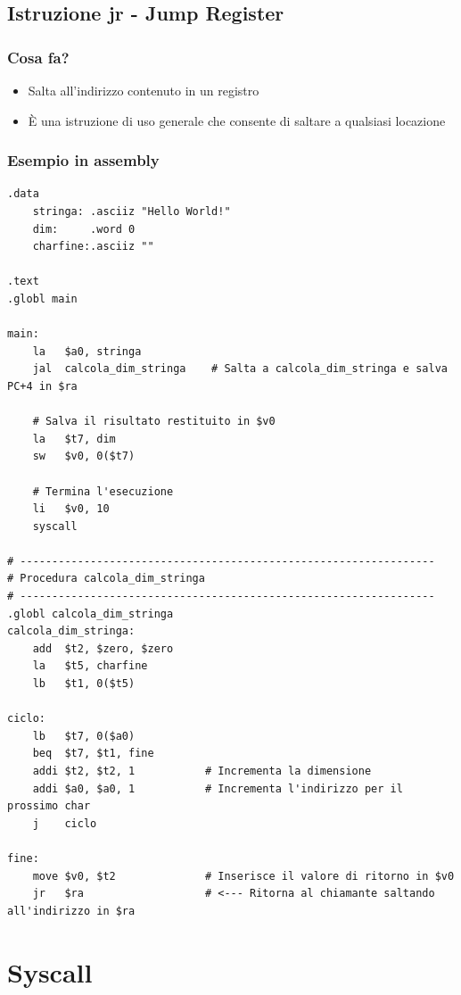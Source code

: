 \newpage
\subsection{Istruzione jr - Jump Register}
\subsubsection{Cosa fa?}
\begin{itemize}
    \item Salta all'indirizzo contenuto in un registro
    \item È una istruzione di uso generale che consente di saltare a qualsiasi locazione 
\end{itemize}

\subsubsection{Esempio in assembly}
\begin{lstlisting}
.data
    stringa: .asciiz "Hello World!"
    dim:     .word 0
    charfine:.asciiz ""

.text
.globl main

main:
    la   $a0, stringa
    jal  calcola_dim_stringa    # Salta a calcola_dim_stringa e salva PC+4 in $ra
    
    # Salva il risultato restituito in $v0
    la   $t7, dim
    sw   $v0, 0($t7)
    
    # Termina l'esecuzione
    li   $v0, 10
    syscall

# -----------------------------------------------------------------
# Procedura calcola_dim_stringa
# -----------------------------------------------------------------
.globl calcola_dim_stringa
calcola_dim_stringa:
    add  $t2, $zero, $zero
    la   $t5, charfine
    lb   $t1, 0($t5)

ciclo:
    lb   $t7, 0($a0)
    beq  $t7, $t1, fine
    addi $t2, $t2, 1           # Incrementa la dimensione
    addi $a0, $a0, 1           # Incrementa l'indirizzo per il prossimo char
    j    ciclo

fine:
    move $v0, $t2              # Inserisce il valore di ritorno in $v0
    jr   $ra                   # <--- Ritorna al chiamante saltando all'indirizzo in $ra
\end{lstlisting}


\newpage
\section{Syscall}
